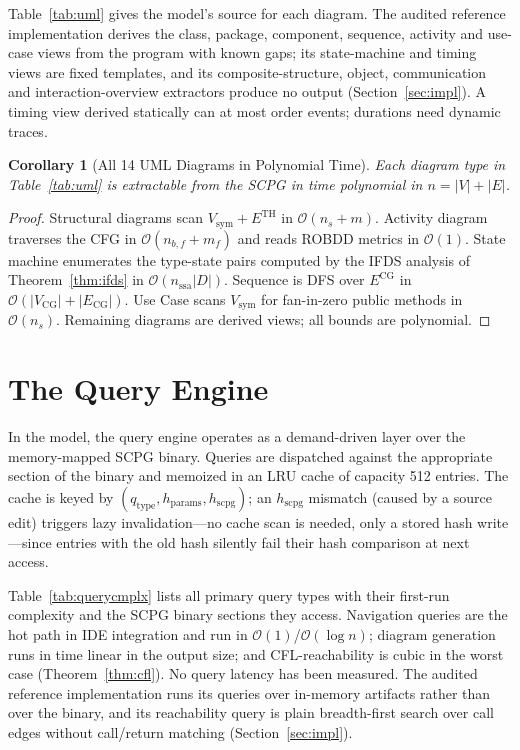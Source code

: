 \documentclass[journal,10pt,twoside]{IEEEtran}
\newtheorem{corollary}[theorem]{Corollary}
\newcommand{\VSYM}{V_{\!\mathrm{sym}}}
\newcommand{\ECG}{E^{\mathrm{CG}}}
\newcommand{\ETH}{E^{\mathrm{TH}}}
\newcommand{\BigO}{\mathcal{O}}
\newcommand{\hscpg}{h_{\mathrm{scpg}}}
\begin{document}
Table~\ref{tab:uml} gives the model's source for each
diagram.  The audited reference implementation derives the
class, package, component, sequence, activity and use-case
views from the program with known gaps; its state-machine and
timing
views are fixed templates, and its composite-structure,
object, communication and interaction-overview extractors
produce no output (Section~\ref{sec:impl}).  A timing view
derived statically can at most order events; durations need
dynamic traces.

\begin{corollary}[All 14 UML Diagrams in Polynomial Time]
\label{cor:uml}
Each diagram type in Table~\ref{tab:uml} is extractable
from the SCPG in time polynomial in $n = |V| + |E|$.
\end{corollary}

\begin{proof}
Structural diagrams scan $\VSYM + \ETH$ in $\BigO(n_s + m)$.
Activity diagram traverses the CFG in $\BigO(n_{b,f}+m_f)$
and reads ROBDD metrics in $\BigO(1)$.
State machine enumerates the type-state pairs computed by
the IFDS analysis of Theorem~\ref{thm:ifds} in
$\BigO(n_{\mathrm{ssa}}|D|)$.
Sequence is DFS over $\ECG$ in
$\BigO(|V_{\mathrm{CG}}|+|E_{\mathrm{CG}}|)$.
Use Case scans $\VSYM$ for fan-in-zero public methods in
$\BigO(n_s)$.  Remaining diagrams are derived views; all
bounds are polynomial.
\end{proof}

\section{The Query Engine}\label{sec:query}

In the model, the query engine operates as a demand-driven
layer over the memory-mapped SCPG binary.  Queries are
dispatched against
the appropriate section of the binary and memoized in an
LRU cache of capacity 512 entries.  The cache is keyed by
$(q_{\mathrm{type}}, h_{\mathrm{params}}, \hscpg)$;
an $\hscpg$ mismatch (caused by a source edit) triggers
lazy invalidation---no cache scan is needed, only a stored
hash write---since entries with the old hash silently fail
their hash comparison at next access.

Table~\ref{tab:querycmplx} lists all primary query types
with their first-run complexity and the SCPG binary sections
they access.  Navigation queries are the hot path in IDE
integration and run in $\BigO(1)$/$\BigO(\log n)$; diagram
generation runs in time linear in the output size; and
CFL-reachability is cubic in the worst case
(Theorem~\ref{thm:cfl}).  No query latency has been measured.
The audited reference implementation runs its queries over
in-memory
artifacts rather than over the binary, and its reachability
query is plain breadth-first search over call edges without
call/return matching (Section~\ref{sec:impl}).
\end{document}
